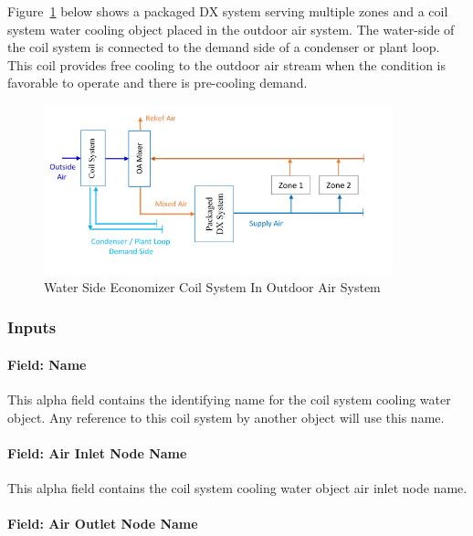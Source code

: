 Figure~\ref{fig:water-side-economizer-coil-system-in-outdoor-air-system} below shows a packaged DX system serving multiple zones and a coil system water cooling object placed in the outdoor air system. The water-side of the coil system is connected to the demand side of a condenser or plant loop.  This coil provides free cooling to the outdoor air stream when the condition is favorable to operate and there is pre-cooling demand.

\begin{figure}[hbtp] %
\centering
\includegraphics[width=0.9\textwidth, height=0.9\textheight, keepaspectratio=true]{media/image142.png}
\caption{Water Side Economizer Coil System In Outdoor Air System \protect \label{fig:water-side-economizer-coil-system-in-outdoor-air-system}}
\end{figure}

\subsubsection{Inputs}\label{inputs}

\paragraph{Field: Name}\label{field-name-06}

This alpha field contains the identifying name for the coil system cooling water object. Any reference to this coil system by another object will use this name.

\paragraph{Field: Air Inlet Node Name}\label{field-air-inlet-node-name-01}

This alpha field contains the coil system cooling water object air inlet node name.

\paragraph{Field: Air Outlet Node Name}\label{field-air-outlet-node-name-01}

